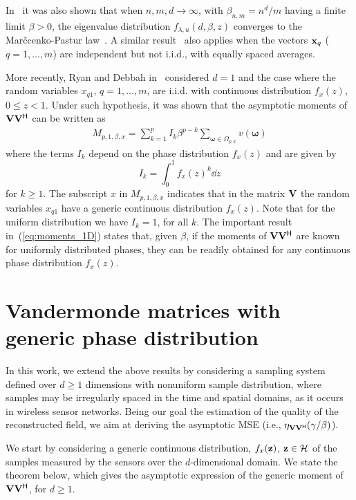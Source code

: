 \documentclass[11pt, draftcls, onecolumn, a4paper]{IEEEtran}
\newcommand{\xv}{{\bf x}}
\newcommand{\zv}{{\bf z}}
\newcommand{\Vm}{{\bf V}}
\newcommand{\Hc}{{\cal H}}
\newcommand{\omegav}{\boldsymbol{\omega}}
\def\Herm{\mathsf{^H}}
\begin{document}
In~\cite{TSP2} it was also shown that when $n,m,d\rightarrow \infty$,
with $\beta_{n,m}=n^d/m$ having a finite limit $\beta>0$, the eigenvalue
distribution $f_{\lambda,u}(d,\beta,z)$ converges to the
Mar\v{c}cenko-Pastur law~\cite{MarcenkoPastur}. A similar
result~\cite{TSP3} also applies when the vectors $\xv_q$
($q=1,\ldots,m$) are independent but not i.i.d., with equally spaced
averages.

More recently, Ryan and Debbah in~\cite{RyanDebbah} considered $d=1$
and the case where the random variables $x_{q1}$, $q=1,\ldots,m$, are
i.i.d. with continuous distribution $f_x(z)$, $0 \le z < 1$. Under
such hypothesis, it was shown that the asymptotic moments of
$\Vm\Vm\Herm$ can be written as
 \begin{eqnarray}
M_{p,1,\beta,x} = \sum_{k=1}^p I_k \beta^{p-k} \sum_{\omegav \in \Omega_{p,k}}v(\omegav)
\label{eq:moments_1D}
\end{eqnarray}
where the terms $I_k$ depend on the phase distribution $f_x(z)$ and
are given by
\[ I_k = \int_0^1 f_x(z)^k \dd z \]
for $k\ge 1$.  The subscript $x$ in $M_{p,1,\beta,x}$ indicates
that in the matrix $\Vm$ the random variables $x_{q1}$ have
a generic continuous distribution $f_x(z)$.  
Note that for the uniform distribution we
have $I_k=1$, for all $k$. The important result
in~(\ref{eq:moments_1D}) states that, given $\beta$, if the moments of
$\Vm\Vm\Herm$ are known for uniformly distributed phases, they can be
readily obtained for any continuous phase distribution $f_x(z)$.



\section{Vandermonde matrices with generic phase distribution}
\label{sec:results-vandermonde} 

In this work, we extend the above results by considering a sampling
system defined over $d\ge 1$ dimensions with nonuniform sample
distribution, where samples may be irregularly spaced in the time and
spatial domains, as it occurs in wireless sensor networks.  Being our
goal the estimation of the quality of the reconstructed field, we aim
at deriving the asymptotic MSE (i.e.,
$\eta_{\Vm\Vm\Herm}(\gamma/\beta)$).


We start by considering a generic continuous distribution,
$f_x(\zv)$, $\zv\in \Hc$ of the samples measured by the sensors over
the $d$-dimensional domain.  We state the theorem below, which gives
the asymptotic expression of the generic moment of $\Vm\Vm\Herm$, for
$d\geq1$.
\end{document}
